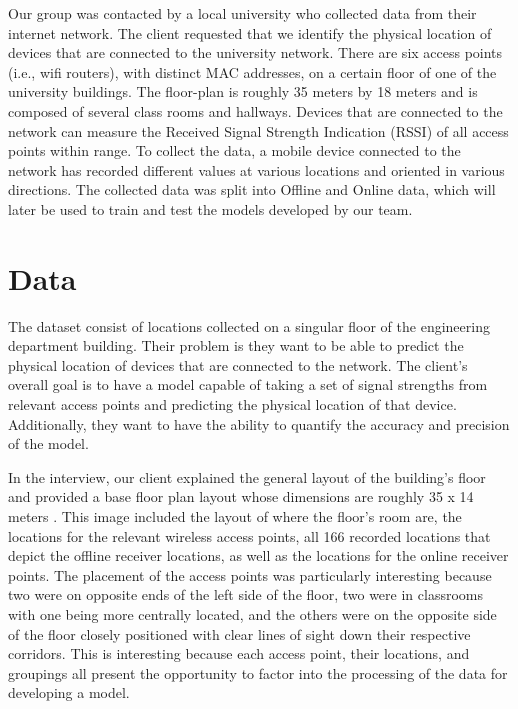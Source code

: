 \documentclass[12pt, conference]{IEEEtran}
\begin{document}
Our group was contacted by a local university who collected data from their internet network. The client requested that we identify the physical location of devices that are connected to the university network. There are six access points (i.e., wifi routers), with distinct MAC addresses, on a certain floor of one of the university buildings. The floor-plan is roughly 35 meters by 18 meters and is composed of several class rooms and hallways. Devices that are connected to the network can measure the Received Signal Strength Indication (RSSI) of all access points within range. To collect the data, a mobile device connected to the network has recorded different values at various locations and oriented in various directions. The collected data was split into Offline and Online data, which will later be used to train and test the models developed by our team.


\section{Data}
The dataset consist of locations collected on a singular floor of the engineering department building. Their problem is they want to be able to predict the physical location of devices that are connected to the network. The client's overall goal is to have a model capable of taking a set of signal strengths from relevant access points and predicting the physical location of that device. Additionally, they want to have the ability to quantify the accuracy and precision of the model.

In the interview, our client explained the general layout of the building's floor and provided a base floor plan layout whose dimensions are roughly 35 x 14 meters . This image included the layout of where the floor's room are, the locations for the relevant wireless access points, all 166 recorded locations that depict the offline receiver locations, as well as the locations for the online receiver points. The placement of the access points was particularly interesting because two were on opposite ends of the left side of the floor, two were in classrooms with one being more centrally located, and the others were on the opposite side of the floor closely positioned with clear lines of sight down their respective corridors. This is interesting because each access point, their locations, and groupings all present the opportunity to factor into the processing of the data for developing a model. 
\end{document}
